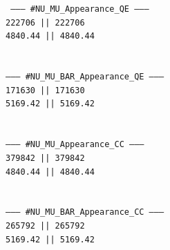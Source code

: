\documentclass[12pt,a4paper]{article}
\theoremstyle{dotless}
\begin{document}
{\tt
\hspace*{2cm} --------- \#NU\_MU\_Appearance\_QE ---------\\
\hspace*{2cm}               222706 ||       222706\\
\hspace*{2cm}              4840.44 ||      4840.44\\
\hspace*{2cm} \\
\hspace*{2cm} \\
\hspace*{2cm} --------- \#NU\_MU\_BAR\_Appearance\_QE ---------\\
\hspace*{2cm}               171630 ||       171630\\
\hspace*{2cm}              5169.42 ||      5169.42\\
\hspace*{2cm} \\
\hspace*{2cm} \\
\hspace*{2cm} --------- \#NU\_MU\_Appearance\_CC ---------\\
\hspace*{2cm}               379842 ||       379842\\
\hspace*{2cm}              4840.44 ||      4840.44\\
\hspace*{2cm} \\
\hspace*{2cm} \\
\hspace*{2cm} --------- \#NU\_MU\_BAR\_Appearance\_CC ---------\\
\hspace*{2cm}               265792 ||       265792\\
\hspace*{2cm}              5169.42 ||      5169.42\\
}
\end{document}

